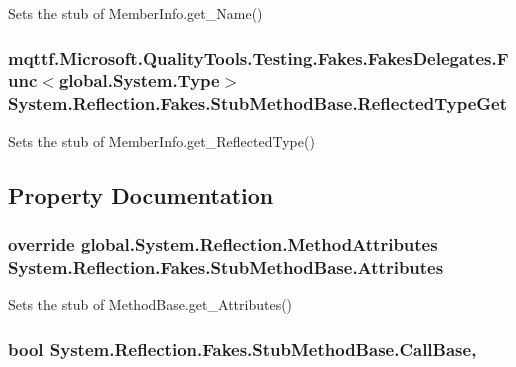 Sets the stub of Member\-Info.\-get\-\_\-\-Name()

\hypertarget{class_system_1_1_reflection_1_1_fakes_1_1_stub_method_base_a5d935cc7c3e591ee0eaec48bdda0ec75}{
\subsubsection[{Reflected\-Type\-Get}]{\setlength{\rightskip}{0pt plus 5cm}mqttf.\-Microsoft.\-Quality\-Tools.\-Testing.\-Fakes.\-Fakes\-Delegates.\-Func$<$global.\-System.\-Type$>$ System.\-Reflection.\-Fakes.\-Stub\-Method\-Base.\-Reflected\-Type\-Get}}\label{class_system_1_1_reflection_1_1_fakes_1_1_stub_method_base_a5d935cc7c3e591ee0eaec48bdda0ec75}


Sets the stub of Member\-Info.\-get\-\_\-\-Reflected\-Type()



\subsection{Property Documentation}
\hypertarget{class_system_1_1_reflection_1_1_fakes_1_1_stub_method_base_ac4cc72462ed4576b680971ea6ef624d8}{
\subsubsection[{Attributes}]{\setlength{\rightskip}{0pt plus 5cm}override global.\-System.\-Reflection.\-Method\-Attributes System.\-Reflection.\-Fakes.\-Stub\-Method\-Base.\-Attributes\hspace{0.3cm}{\ttfamily [get]}}}\label{class_system_1_1_reflection_1_1_fakes_1_1_stub_method_base_ac4cc72462ed4576b680971ea6ef624d8}


Sets the stub of Method\-Base.\-get\-\_\-\-Attributes()

\hypertarget{class_system_1_1_reflection_1_1_fakes_1_1_stub_method_base_a1bbc5965653c0c39346fa13f69671cc9}{
\subsubsection[{Call\-Base}]{\setlength{\rightskip}{0pt plus 5cm}bool System.\-Reflection.\-Fakes.\-Stub\-Method\-Base.\-Call\-Base\hspace{0.3cm}{\ttfamily [get]}, {\ttfamily [set]}}}\label{class_system_1_1_reflection_1_1_fakes_1_1_stub_method_base_a1bbc5965653c0c39346fa13f69671cc9}


